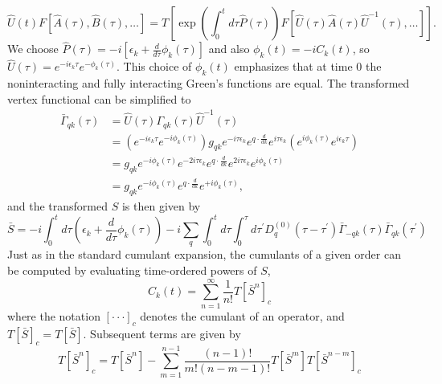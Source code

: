 \begin{equation}
\hat{U}(t) F[\hat{A}(\tau), \hat{B}(\tau), \ldots] =T\left[\exp \left(\int_0^t d \tau \hat{P}(\tau)\right) F\left[\hat{U}(\tau) \hat{A}(\tau) \hat{U}^{-1}(\tau), \ldots\right]\right] .
\end{equation}
We choose $\hat{P}(\tau)=-i\left[\epsilon_k+\frac{d}{d \tau} \phi_k(\tau)\right]$ and also $\phi_k(t)=-i C_k(t)$, so $\hat{U}(\tau)=e^{-i \epsilon_k \tau} e^{-\phi_k(\tau)}$.
 This choice of $\phi_k(t)$ emphasizes that at time 0 the noninteracting and fully interacting Green's functions are equal.
The transformed vertex functional can be simplified to
\begin{align}
    \bar{\Gamma}_{q k}(\tau) &= \hat{U}(\tau) \Gamma_{q k}(\tau) \hat{U}^{-1}(\tau)\\
&= \left( e^{-i \epsilon_k \tau} e^{-i\phi_k(\tau)} \right) g_{q k} e^{-i \tau \epsilon_k} e^{q \cdot \frac{d}{d k}} e^{i \tau \epsilon_k} \left( e^{i\phi_k(\tau)} e^{i \epsilon_k \tau} \right) \\
&= g_{q k} e^{-i\phi_k(\tau)}   e^{-2i \tau \epsilon_k} e^{q \cdot \frac{d}{d k}} e^{2i \tau \epsilon_k} e^{i\phi_k(\tau)} \\
&= g_{q k} e^{-i \phi_k(\tau)} e^{q \cdot \frac{d}{d k}} e^{+i \phi_k(\tau)},
\end{align}
and the transformed $S$ is then given by
\begin{equation}
    \bar{S}= -i \int_0^t d \tau\left(\epsilon_k+\frac{d}{d \tau} \phi_k(\tau)\right) -i \sum_q \int_0^t d \tau \int_0^\tau d \tau^{\prime} D_q^{(0)}\left(\tau-\tau^{\prime}\right) \bar{\Gamma}_{-q k}(\tau) \bar{\Gamma}_{q k}\left(\tau^{\prime}\right)
\end{equation}
Just as in the standard cumulant expansion, the cumulants of a given order can be computed by evaluating time-ordered powers of $S$,
\begin{equation}
    C_k(t)=\sum_{n=1}^{\infty} \frac{1}{n!} T\left[\bar{S}^n\right]_c
\label{a7}
\end{equation}
where the notation $[\cdot \cdot \cdot]_c$ denotes the cumulant of an operator, and $T[\bar{S}]_c=T[\bar{S}]$. Subsequent terms are given by
\begin{equation}
    T\left[\bar{S}^n\right]_c=T\left[\bar{S}^n\right]-\sum_{m=1}^{n-1} \frac{(n-1)!}{m!(n-m-1)!} T\left[\bar{S}^m\right] T\left[\bar{S}^{n-m}\right]_c
\end{equation}

